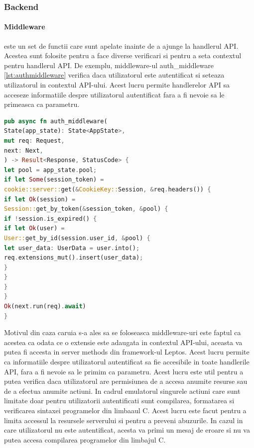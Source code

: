 \documentclass[titlepage,12pt]{article}
\DeclareRobustCommand{\code}[1]{{\ttfamily\small #1}}
\begin{document}
\subsubsection{Backend}

\paragraph{Middleware} este un set de functii care sunt apelate inainte de a ajunge la handlerul API. Acestea sunt folosite pentru a face diverse verificari si pentru a seta contextul pentru handlerul API. De exemplu, middleware-ul \code{auth\_middleware} \cref{lst:authmiddleware} verifica daca utilizatorul este autentificat si seteaza utilizatorul in contextul API-ului. Acest lucru permite handlerelor API sa acceseze informatiile despre utilizatorul autentificat fara a fi nevoie sa le primeasca ca parametru.

\begin{lstlisting}[language=Rust,caption={Middleware pentru autentificare},label={lst:authmiddleware}]
pub async fn auth_middleware(
State(app_state): State<AppState>,
mut req: Request,
next: Next,
) -> Result<Response, StatusCode> {
let pool = app_state.pool;
if let Some(session_token) =
cookie::server::get(&CookieKey::Session, &req.headers()) {
if let Ok(session) =
Session::get_by_token(&session_token, &pool) {
if !session.is_expired() {
if let Ok(user) =
User::get_by_id(session.user_id, &pool) {
let user_data: UserData = user.into();
req.extensions_mut().insert(user_data);
}
}
}
}
Ok(next.run(req).await)
}
\end{lstlisting}

Motivul din caza caruia s-a ales sa se foloseasca middleware-uri este faptul ca acestea ca odata ce o extensie este adaugata in contextul API-ului, aceasta va putea fi accesta in \code{server methods} din framework-ul Leptos. Acest lucru permite ca informatiile despre utilizatorul autentificat sa fie accesibile in toate handlerile API, fara a fi nevoie sa le primim ca parametru. Acest lucru este util pentru a putea verifica daca utilizatorul are permisiunea de a accesa anumite resurse sau de a efectua anumite actiuni. In cadrul emulatorul singurele actiuni care sunt limitate doar pentru utilizatorii autentificati sunt compilarea, formatarea si verificarea sintaxei programelor din limbaaul C. Acest lucru este facut pentru a limita accessul la resursele serverului si pentru a preveni abuzurile. In cazul in care utilizatorul nu este autentificat, acesta va primi un mesaj de eroare si nu va putea accesa compilarea programelor din limbajul C.
\end{document}
